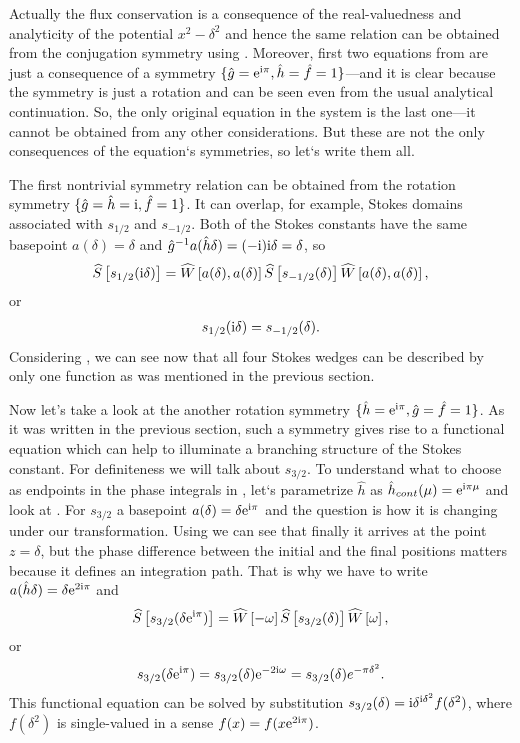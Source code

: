 \documentclass[12pt]{iopart}
\def\S{\widehat{S}}
\def\W{\widehat{W}}
\def\f{\hat{f}}
\def\g{\hat{g}}
\def\h{\hat{h}}
\def\unity{1}
\def\w{\omega}
\begin{document}
Actually the flux conservation is a consequence of the real-valuedness and analyticity 
of the potential $x^2-\delta^2$ and hence the same relation can be obtained from the 
conjugation symmetry using . Moreover, first two equations from  
are just a consequence of a symmetry $\{\g=\rme^{\rmi\pi},\h=\f=\unity\}$---and it is clear 
because the symmetry is just a rotation and can be seen even from the usual analytical continuation. 
So, the only original equation in the system  is the last one---it cannot 
be obtained from any other considerations. But these are not the only consequences of the 
equation`s symmetries, so let`s write them all.

The first nontrivial symmetry relation can be obtained from the rotation symmetry 
$\{\g=\h=\rmi,\f=\unity\}$. It can overlap, for example, Stokes domains associated with
$s_{1/2}$ and $s_{-1/2}$. Both of the Stokes constants have the same 
basepoint $a(\delta)=\delta$ and $\g^{-1}a(\h\delta)=(-\rmi)\rmi\delta=\delta$, so
\begin{eqnarray}
\S \left[ s_{1/2}(\rmi \delta) \right] = 
\W \left[ a(\delta), a(\delta) \right]
\S \left[ s_{-1/2}(\delta) \right]
\W \left[ a(\delta), a(\delta) \right],
\end{eqnarray}
or
\begin{eqnarray}
s_{1/2}(\mathrm{i} \delta) = s_{-1/2}(\delta).
\label{eq:websym_1}
\end{eqnarray}
Considering , we can 
see now that all four Stokes wedges can be described by only one function as 
was mentioned in the previous section. 

Now let's take a look at the another rotation symmetry $\{\h=\rme^{\rmi\pi},\g=\f=\unity\}$. 
As it was written in the previous section, such a symmetry gives rise to a functional 
equation which can help to illuminate a branching structure of the Stokes constant. 
For definiteness we will talk about $s_{3/2}$. To understand what to choose as endpoints 
in the phase integrals in , let`s parametrize $\h$ as $\h_{cont}(\mu)=\rme^{\rmi\pi\mu}$ 
and look at . For $s_{3/2}$ a basepoint $a(\delta)=\delta \mathrm{e}^{\mathrm{i}\pi}$ 
and the question is how it is changing under our transformation. Using  
we can see that finally it arrives at the point $z=\delta$, but the phase difference between the
initial and the final positions matters because it defines an integration path.
That is why we have to write $a(\h\delta)=\delta \rme^{2\rmi\pi}$ and
\begin{eqnarray}
\S \left[ s_{3/2}(\delta \rme^{\rmi\pi}) \right] = 
\W \left[- \w \right]
\S \left[ s_{3/2} (\delta) \right]
\W \left[  \w \right],
\end{eqnarray}
or
\begin{eqnarray}
s_{3/2}(\delta \rme^{\rmi\pi})=s_{3/2}(\delta)\rme^{-2\rmi \w}=s_{3/2}(\delta)e^{-\pi\delta^2}.
\label{eq:websym_2}
\end{eqnarray}
This functional equation can be solved by substitution 
$s_{3/2}(\delta)=\mathrm{i}\delta^{\mathrm{i}\delta^2}f(\delta^2)$, where $f(\delta^2)$
is single-valued in a sense $f(x)=f(x \mathrm{e}^{2\mathrm{i}\pi})$.
\end{document}
